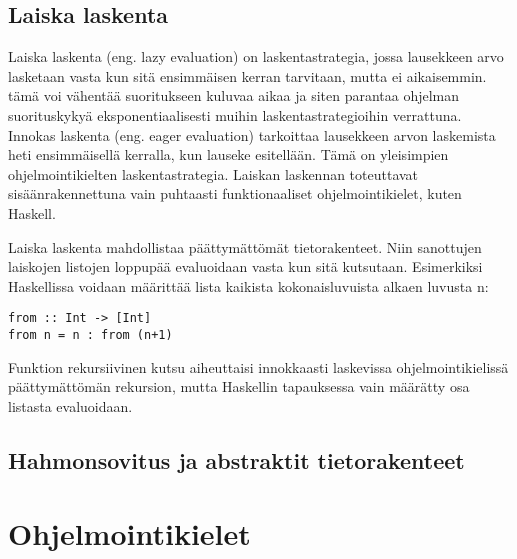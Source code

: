 \subsection{Laiska laskenta}
Laiska laskenta (eng. lazy evaluation) on laskentastrategia, jossa lausekkeen arvo lasketaan vasta kun sitä ensimmäisen
kerran tarvitaan, mutta ei aikaisemmin. tämä voi vähentää suoritukseen kuluvaa aikaa ja siten parantaa ohjelman
suorituskykyä eksponentiaalisesti muihin laskentastrategioihin verrattuna. Innokas laskenta (eng. eager evaluation)
tarkoittaa lausekkeen arvon laskemista heti ensimmäisellä kerralla, kun lauseke esitellään. Tämä on yleisimpien
ohjelmointikielten laskentastrategia. Laiskan laskennan toteuttavat sisäänrakennettuna vain puhtaasti funktionaaliset
ohjelmointikielet, kuten Haskell.\cite{languagedesign}

Laiska laskenta mahdollistaa päättymättömät tietorakenteet. Niin sanottujen laiskojen listojen loppupää evaluoidaan
vasta kun sitä kutsutaan. Esimerkiksi Haskellissa voidaan määrittää lista kaikista kokonaisluvuista alkaen luvusta n:
\begin{verbatim}
from :: Int -> [Int]
from n = n : from (n+1)
\end{verbatim}
Funktion rekursiivinen kutsu aiheuttaisi innokkaasti laskevissa ohjelmointikielissä päättymättömän rekursion, mutta
Haskellin tapauksessa vain määrätty osa listasta evaluoidaan.\cite{languagedesign}



\subsection{Hahmonsovitus ja abstraktit tietorakenteet}


\section{Ohjelmointikielet}


